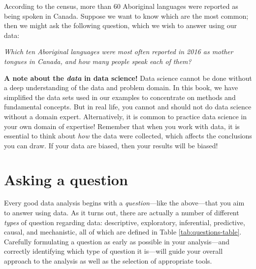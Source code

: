 \documentclass[
  12pt,
]{krantz}
\renewenvironment{quote}{\begin{VF}}{\end{VF}}
\begin{document}
According to the census, more than 60 Aboriginal languages were reported
as being spoken in Canada. Suppose we want to know which are the most common;
then we might ask the following question, which we wish to answer using our data:

\emph{Which ten Aboriginal languages were most often reported in 2016 as mother
tongues in Canada, and how many people speak each of them?}

\begin{quote}
\textbf{A note about the \emph{data} in data science!}
Data science cannot be done without a deep understanding of the data and
problem domain. In this book, we have simplified the data sets used in our
examples to concentrate on methods and fundamental concepts. But in real
life, you cannot and should not do data science without a domain expert.
Alternatively, it is common to practice data science in your own domain of
expertise! Remember that when you work with data, it is essential to think
about \emph{how} the data were collected, which affects the conclusions you can
draw. If your data are biased, then your results will be biased!
\end{quote}

\hypertarget{asking-a-question}{%
\section{Asking a question}\label{asking-a-question}}

Every good data analysis begins with a \emph{question}---like the
above---that you aim to answer using data. As it turns out, there
are actually a number of different \emph{types} of question regarding data:
descriptive, exploratory, inferential, predictive, causal, and mechanistic,
all of which are defined in Table \ref{tab:questions-table}.
Carefully formulating a question as early as possible in your analysis---and
correctly identifying which type of question it is---will guide your overall approach to
the analysis as well as the selection of appropriate tools.
\end{document}

